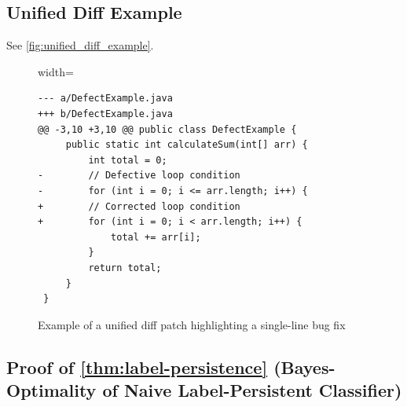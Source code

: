 \documentclass[authoryear,final,5p,times,twocolumn]{elsarticle}
\theoremstyle{plain}
\begin{document}
%  
%  
% 

% 


\pagebreak

\appendix

\subsection{Unified Diff Example}
\label{appendix:unified_diff_exp}
See \autoref{fig:unified_diff_example}.


\begin{figure}[h]
    \centering
    \begin{adjustbox}{width=\columnwidth}
        \begin{lstlisting}[style=diff,basicstyle=\ttfamily\scriptsize]
--- a/DefectExample.java
+++ b/DefectExample.java
@@ -3,10 +3,10 @@ public class DefectExample {
     public static int calculateSum(int[] arr) {
         int total = 0;
-        // Defective loop condition
-        for (int i = 0; i <= arr.length; i++) {
+        // Corrected loop condition
+        for (int i = 0; i < arr.length; i++) {
             total += arr[i];
         }
         return total;
     }
 }
        \end{lstlisting}
    \end{adjustbox}
    \caption{Example of a unified diff patch highlighting a single-line bug fix}
    \label{fig:unified_diff_example}
\end{figure}



\subsection{Proof of \autoref{thm:label-persistence} (Bayes-Optimality of Naive Label-Persistent Classifier)}
\label{appendix:bayes_proof}
\end{document}
